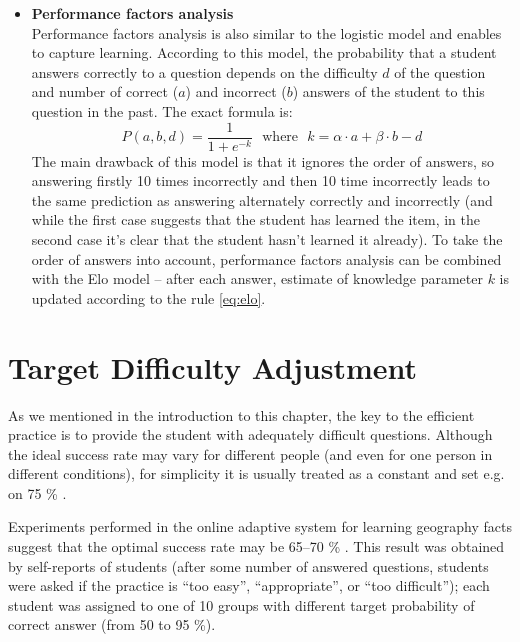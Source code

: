\documentclass[12pt, twoside]{fithesis2}
\renewcommand{\_}{\leavevmode \kern0.07em\vbox{\hrule width0.4em}}
\newcommand{\squarebullet}{\textcolor{black}{\raisebox{0.15em}{\rule{4pt}{4pt}}}}
\newcommand{\emptysquarebullet}{\textcolor{black}{\raisebox{0.10em}{\tiny$\square$}}}
\newenvironment{myItemize}{
  \begin{itemize}[leftmargin=2em,rightmargin=1em,itemsep=\parskip ,parsep=0em,topsep=0em,partopsep=0em]
  \renewcommand{\labelitemi}{\squarebullet}
  \renewcommand{\labelitemii}{\textbullet}
}{
  \end{itemize}
}
\begin{document}
\begin{myItemize}
\item \textbf{Performance factors analysis}\\
  Performance factors analysis \cite{performance-factors-analysis} is also similar to the logistic model
  and enables to capture learning.
  According to this model, the probability that a student answers correctly to a question
  depends on the difficulty $d$ of the question and number of correct ($a$) and incorrect ($b$) answers of the student to this question in the past. The exact formula is:
  \begin{equation}\label{eq:pfa}
  P(a, b, d) = \frac{1}{1 + e^{-k}}
  \text{~~where~~} k = \alpha \cdot a + \beta \cdot b - d
  \end{equation}
  The main drawback of this model is that it ignores the order of answers,
  so answering firstly 10 times incorrectly and then 10 time incorrectly leads to the same prediction as answering alternately correctly and incorrectly (and while the first case suggests that the student has learned the item, in the second case it's clear that the student hasn't learned it already).
  To take the order of answers into account, performance factors analysis can be combined with the Elo model \cite{slepe-mapy} -- after each answer, estimate of knowledge parameter $k$ is updated according to the rule \ref{eq:elo}.
\end{myItemize}



\section{Target Difficulty Adjustment}
\label{sec:target-difficulty}

As we mentioned in the introduction to this chapter,
the key to the efficient practice is to provide the student with adequately difficult questions.
Although the ideal success rate may vary for different people (and even for one person in different conditions),
for simplicity it is usually treated as a constant and set e.g. on 75 \% \cite{slepe-mapy, adaptive-practice-irt-math}.

Experiments performed in the online adaptive system for learning geography facts suggest that the optimal success rate may be 65--70 \% \cite{slepe-mapy-motivation}.
This result was obtained by self-reports of students (after some number of answered questions, students were asked if the practice is ``too easy'', ``appropriate'', or ``too difficult'');
each student was assigned to one of 10 groups with different target probability of correct answer (from 50 to 95 \%).
\end{document}
